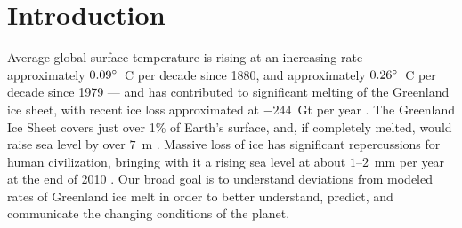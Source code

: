 \documentclass[12pt]{article}
\begin{document}
\section{Introduction \label{sec:introduction}}

Average global surface temperature is rising at an increasing rate --- approximately $0.09\degree$~C per decade since 1880, and approximately $0.26\degree$~C per decade since 1979 \cite[][]{ipcc2013_atmosphere}
--- and has contributed to significant melting of the
Greenland ice sheet, with recent ice loss approximated at $-244$~Gt per
year \cite[][]{Harig+2015a,Harig+2016}. The Greenland Ice Sheet covers just over 1\% of
Earth's surface, and, if completely melted, would raise sea level by over $7$~m
\cite[][]{ipcc2013_cryosphere}.
Massive loss of ice has
significant repercussions for human civilization, bringing with it a rising sea
level at about $1$--$2$~mm per year at the end of 2010
\cite[][]{ipcc2013_sealevel}.  Our broad goal is to understand deviations from modeled rates of Greenland ice melt in order to better understand, predict, and
communicate the changing conditions of the planet.
\end{document}
